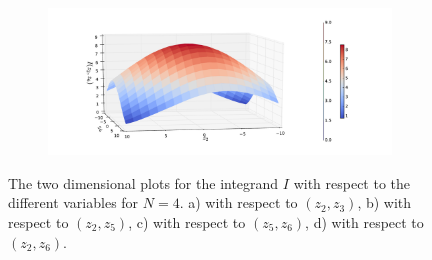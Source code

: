 \begin{figure}
\begin{subfigure}{.4\textwidth}
		\caption{}
	\end{subfigure}%
	\begin{subfigure}{.4\textwidth}
		\centering
			\includegraphics[width=1\linewidth]{./figures/basket_call_2d_time_stepping/integrand_plotting/N_4/2d_plots/z_2_6/smoothed_integrand_basket_2D_N_4_z2_6_80}
		\caption{}
		\end{subfigure}
	\caption{The two dimensional plots for the integrand $I$ with respect to the different variables for $N=4$. a) with respect to $(z_2,z_3)$, b) with respect to $(z_2,z_5)$, c) with respect to $(z_5,z_6)$,  d) with respect to $(z_2,z_6)$.}
	\label{fig:integrand_two_dim_N_4}
\end{figure}
\FloatBarrier
\FloatBarrier
